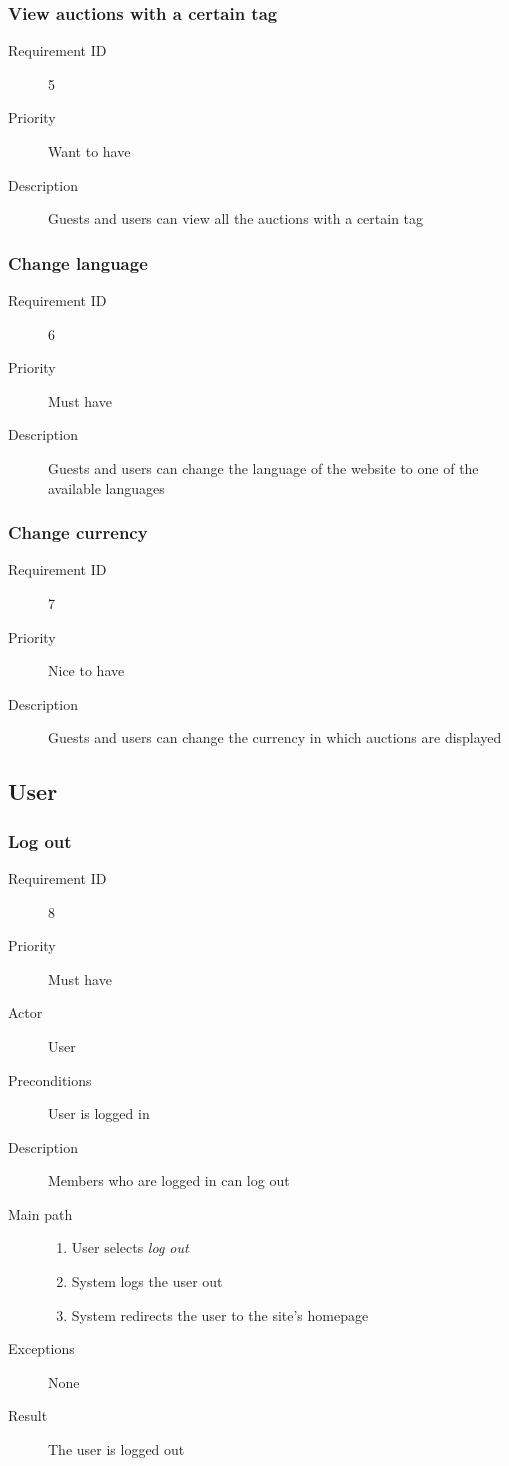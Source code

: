 		\subsubsection{View auctions with a certain tag}
			\begin{description}
				\item[Requirement ID] 5
				\item[Priority] Want to have
				\item[Description] Guests and users can view all the auctions with a certain tag
			\end{description}
		\subsubsection{Change language}
			\begin{description}
				\item[Requirement ID] 6
				\item[Priority] Must have
				\item[Description] Guests and users can change the language of the website to one
					of the available languages
			\end{description}
		\subsubsection{Change currency}
			\begin{description}
				\item[Requirement ID] 7
				\item[Priority] Nice to have
				\item[Description] Guests and users can change the currency in which auctions are
					displayed
			\end{description}
	\subsection{User}
		\subsubsection{Log out}
			\begin{description}
				\item[Requirement ID] 8
				\item[Priority] Must have
				\item[Actor] User
				\item[Preconditions] User is logged in
				\item[Description] Members who are logged in can log out
				\item[Main path]
 					\begin{enumerate}
						\item User selects \emph{log out}
						\item System logs the user out
						\item System redirects the user to the site's homepage
					\end{enumerate}
				\item[Exceptions] None
				\item[Result] The user is logged out
			\end{description}
